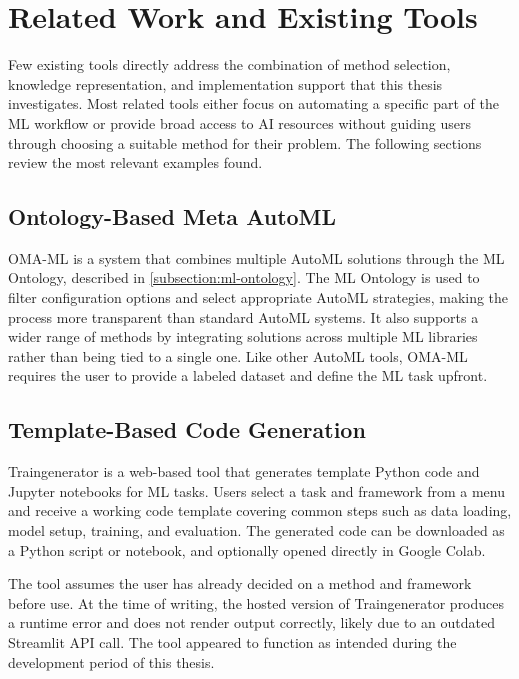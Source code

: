 \section{Related Work and Existing Tools}

Few existing tools directly address the combination of 
method selection, knowledge representation, and 
implementation support that this thesis investigates. 
Most related tools either focus on automating a specific 
part of the ML workflow or provide broad access to AI 
resources without guiding users through choosing a 
suitable method for their problem. The following sections 
review the most relevant examples found.

\subsection{Ontology-Based Meta AutoML}

OMA-ML \parencite{zender2022ontology_based_meta_automl} 
is a system that combines multiple AutoML solutions 
through the ML Ontology, described in \ref{subsection:ml-ontology}.
The ML Ontology is used to filter configuration 
options and select appropriate AutoML strategies, 
making the process more transparent than standard 
AutoML systems. It also supports a wider range of 
methods by integrating solutions across multiple 
ML libraries rather than being tied to a single one.
Like other AutoML tools, OMA-ML requires the user 
to provide a labeled dataset and define the ML task 
upfront. 

\subsection{Template-Based Code Generation}

Traingenerator \parencite{rieke2021traingenerator} 
is a web-based tool that generates template Python 
code and Jupyter notebooks for ML tasks. Users select 
a task and framework from a menu and receive a working 
code template covering common steps such as data 
loading, model setup, training, and evaluation. 
The generated code can be downloaded as a Python 
script or notebook, and optionally opened directly 
in Google Colab.

The tool assumes the user has already decided on a 
method and framework before use. At the time of 
writing, the hosted version of Traingenerator 
produces a runtime error and does not render output 
correctly, likely due to an outdated Streamlit API 
call. The tool appeared to function as intended 
during the development period of this thesis.

